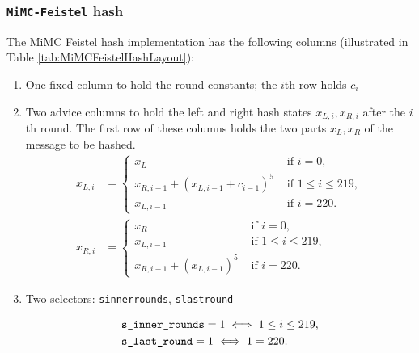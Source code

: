 \documentclass[10pt]{article}
\begin{document}
\subsubsection{\texttt{MiMC-Feistel} hash}
The MiMC Feistel hash implementation has the following columns (illustrated in Table \ref{tab:MiMCFeistelHashLayout}):
\begin{enumerate}
  \item One fixed column to hold the round constants; the $i$th row holds $c_i$
  \item Two advice columns to hold the left and right hash states $x_{L,i}, x_{R,i}$ after the $i$th round. The first row of these columns holds the two parts $x_L, x_R$ of the message to be hashed.
    \begin{align*}
      x_{L,i} &= 
      \begin{cases}
        x_L & \text{ if } i = 0,\\
        x_{R, i-1} + \left( x_{L,i-1}+c_{i-1}\right)^5  & \text{ if } 1 \le i \le  219,\\
        x_{L,i-1}  & \text{ if } i=220.
      \end{cases}\\
      x_{R,i} &= 
      \begin{cases}
        x_R & \text{ if } i = 0,\\
         x_{L,i-1} & \text{ if } 1 \le i \le  219,\\
         x_{R,i-1} + \left( x_{L,i-1}\right)^5  & \text{ if } i=220.
      \end{cases}
    \end{align*}
  \item Two selectors: \texttt{s\textunderscore inner\textunderscore rounds}, \texttt{s\textunderscore last\textunderscore round}

    \begin{align*}
      & \texttt{s\textunderscore inner\textunderscore rounds} = 1  \iff 1 \le i\le 219,\\
      & \texttt{s\textunderscore last\textunderscore round} = 1  \iff 1 = 220.
    \end{align*}
\end{enumerate}
\end{document}
